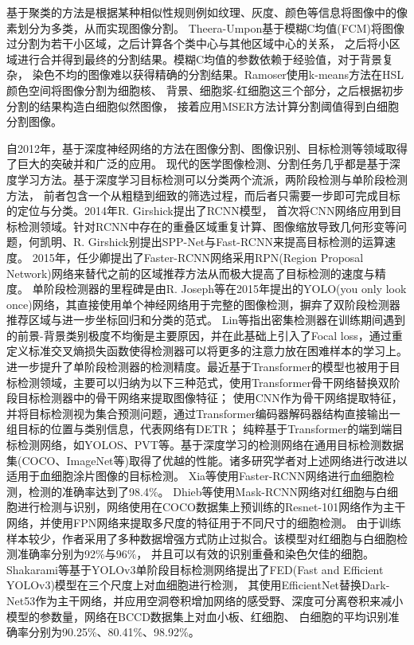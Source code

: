 基于聚类的方法是根据某种相似性规则例如纹理、灰度、颜色等信息将图像中的像素划分为多类，从而实现图像分割。
Theera-Umpon\cite{theera2005white}基于模糊C均值(FCM)将图像过分割为若干小区域，之后计算各个类中心与其他区域中心的关系，
之后将小区域进行合并得到最终的分割结果。模糊C均值的参数依赖于经验值，对于背景复杂，
染色不均的图像难以获得精确的分割结果。Ramoser\cite{ramoser2006leukocyte}使用k-means方法在HSL颜色空间将图像分割为细胞核、
背景、细胞浆-红细胞这三个部分，之后根据初步分割的结果构造白细胞似然图像，
接着应用MSER方法计算分割阈值得到白细胞分割图像。

自2012年，基于深度神经网络的方法在图像分割、图像识别、目标检测等领域取得了巨大的突破并和广泛的应用。
现代的医学图像检测、分割任务几乎都是基于深度学习方法。基于深度学习目标检测可以分类两个流派，两阶段检测与单阶段检测方法，
前者包含一个从粗糙到细致的筛选过程，而后者只需要一步即可完成目标的定位与分类。2014年R. Girshick\cite{girshick2014rich}提出了RCNN模型，
首次将CNN网络应用到目标检测领域。针对RCNN中存在的重叠区域重复计算、图像缩放导致几何形变等问题，何凯明\cite{he2015spatial}、R. Girshick\cite{girshick2015fast}别提出SPP-Net与Fast-RCNN来提高目标检测的运算速度。
2015年，任少卿\cite{ren2015faster}提出了Faster-RCNN网络采用RPN(Region Proposal Network)网络来替代之前的区域推荐方法从而极大提高了目标检测的速度与精度。
单阶段检测器的里程碑是由R. Joseph\cite{redmon2016you}等在2015年提出的YOLO(you only look once)网络，其直接使用单个神经网络用于完整的图像检测，摒弃了双阶段检测器推荐区域与进一步坐标回归和分类的范式。
Lin等\cite{lin2017focal}指出密集检测器在训练期间遇到的前景-背景类别极度不均衡是主要原因，并在此基础上引入了Focal loss，通过重定义标准交叉熵损失函数使得检测器可以将更多的注意力放在困难样本的学习上。
进一步提升了单阶段检测器的检测精度。最近基于Transformer\cite{vaswani2017attention}的模型也被用于目标检测领域，主要可以归纳为以下三种范式，使用Transformer骨干网络替换双阶段目标检测器中的骨干网络来提取图像特征；
使用CNN作为骨干网络提取特征，并将目标检测视为集合预测问题，通过Transformer编码器解码器结构直接输出一组目标的位置与类别信息，代表网络有DETR\cite{zhu2020deformable}；
纯粹基于Transformer的端到端目标检测网络，如YOLOS\cite{fang2021you}、PVT\cite{wang2021pyramid}等。基于深度学习的检测网络在通用目标检测数据集(COCO、ImageNet等)取得了优越的性能。诸多研究学者对上述网络进行改进以适用于血细胞涂片图像的目标检测。
Xia\cite{xia2019automated}等使用Faster-RCNN网络进行血细胞检测，检测的准确率达到了98.4\%。
Dhieb\cite{dhieb2019automated}等使用Mask-RCNN网络对红细胞与白细胞进行检测与识别，网络使用在COCO数据集上预训练的Resnet-101网络作为主干网络，并使用FPN网络来提取多尺度的特征用于不同尺寸的细胞检测。
由于训练样本较少，作者采用了多种数据增强方式防止过拟合。该模型对红细胞与白细胞检测准确率分别为92\%与96\%，
并且可以有效的识别重叠和染色欠佳的细胞。
Shakarami\cite{shakarami2021fast}等基于YOLOv3单阶段目标检测网络提出了FED(Fast and Efficient YOLOv3)模型在三个尺度上对血细胞进行检测，
其使用EfficientNet替换Dark-Net53作为主干网络，并应用空洞卷积增加网络的感受野、深度可分离卷积来减小模型的参数量，网络在BCCD数据集上对血小板、红细胞、
白细胞的平均识别准确率分别为90.25\%、80.41\%、98.92\%。

